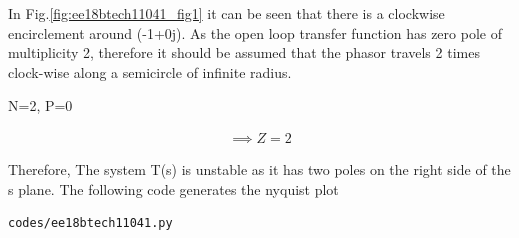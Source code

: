 \begin{enumerate}[label=\thesection.\arabic*.,ref=\thesection.\theenumi]
In Fig.\ref{fig:ee18btech11041_fig1} it can be seen that there is a clockwise encirclement around (-1+0j).
As the open loop transfer function has zero pole of multiplicity 2, therefore it should be assumed that the phasor travels 2 times clock-wise along a semicircle of infinite radius. 

\begin{center}
N=2, P=0    
\end{center}

\begin{align}
    \implies Z = 2
\end{align}

Therefore, The system T(s) is unstable as it has two poles on the right side of the s plane. 
The following code generates the nyquist plot
\begin{lstlisting}
codes/ee18btech11041.py
\end{lstlisting}


\end{enumerate}
